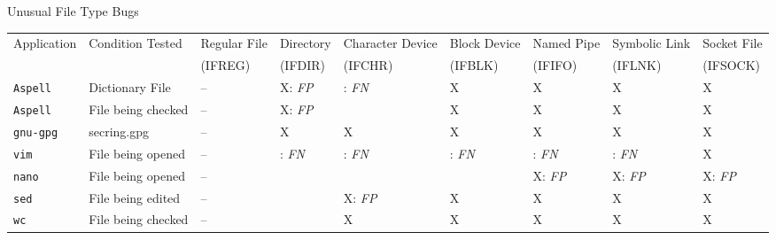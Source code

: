 \documentclass[pdf]{beamer}
\newcommand{\tickmark}{\ding{51}}
\begin{document}
\begin{frame}{Unusual File Type Bugs}
\begin{table}[t]
    \scriptsize{}
    \begin{tabular}{l  l  |  l  l  l  l  l  l  l}
    \toprule{}
        Application       & Condition Tested           & Regular File           & Directory               & Character Device        & Block Device           & Named Pipe                 & Symbolic Link             & Socket File \\
                          &                            &  (IFREG)               & (IFDIR)                 & (IFCHR)                 & (IFBLK)                & (IFIFO)                    & (IFLNK)                   & (IFSOCK)\\
\hline
        {\tt Aspell}      & Dictionary File            & --                     & X: \textit{FP}          & \tickmark: \textit{FN}  & X                      & X                          & X                         & X          \\
        {\tt Aspell}      & File being checked         & --                     & X: \textit{FP}          & \tickmark               & X                      & X                          & X                         & X          \\
        {\tt gnu-gpg}     & secring.gpg                & --                     & X                       & X                       & X                      & X                          & X                         & X          \\
        {\tt vim}         & File being opened          & --                     & \tickmark: \textit{FN}  & \tickmark: \textit{FN}  & \tickmark: \textit{FN} & \tickmark: \textit{FN}     & \tickmark: \textit{FN}    & X          \\
        {\tt nano}        & File being opened          & --                     & \tickmark               & \tickmark               & \tickmark              & X: \textit{FP}             & X: \textit{FP}            & X: \textit{FP} \\
        {\tt sed}         & File being edited          & --                     & \tickmark               & X: \textit{FP}          & X                      & X                          & X                         & X          \\
        {\tt wc}          & File being checked         & --                     & \tickmark               & X                       & X                      & X                          & X                         & X          \\

\end{tabular}
\end{table}
\end{frame}
\end{document}
